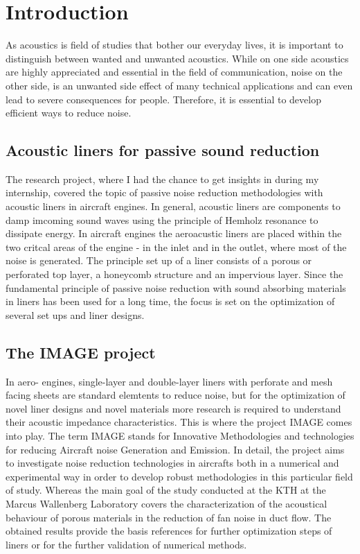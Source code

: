 \documentclass[11pt]{report} %
\begin{document}
\chapter{Introduction} 
As acoustics is field of studies that bother our everyday lives, it is important to distinguish between wanted and unwanted acoustics.
While on one side acoustics are highly appreciated and essential in the field of communication, noise on the other side, is an unwanted side effect of many technical applications and can even lead to severe consequences for people.
Therefore, it is essential to develop efficient ways to reduce noise.

\section{Acoustic liners for passive sound reduction}
The research project, where I had the chance to get insights in during my internship, covered the topic of passive noise reduction methodologies with acoustic liners in aircraft engines.
In general, acoustic liners are components to damp imcoming sound waves using the principle of Hemholz resonance to dissipate energy.
In aircraft engines the aeroacustic liners are placed within the two critcal areas of the engine - in the inlet and in the outlet, where most of the noise is generated. 	 
The principle set up of a liner consists of a porous or perforated top layer, a honeycomb structure and an impervious layer. 
Since the fundamental principle of passive noise reduction with sound absorbing materials in liners has been used for a long time, the focus is set on the optimization of several set ups and liner designs.


\section{The IMAGE project} 
In aero- engines, single-layer and double-layer liners with perforate and mesh facing sheets are standard elemtents to reduce noise, but for the optimization of novel liner designs and novel materials more research is required to understand their acoustic impedance characteristics.
This is where the project IMAGE comes into play.
The term IMAGE stands for Innovative Methodologies and technologies for reducing Aircraft noise Generation and Emission.
In detail, the project aims to investigate noise reduction technologies in aircrafts both in a numerical and experimental way in order to develop robust methodologies in this particular field of study.  
Whereas the main goal of the study conducted at the KTH at the Marcus Wallenberg Laboratory covers the characterization of the acoustical behaviour of porous materials in the reduction of fan noise in duct flow. 
The obtained results provide the  basis references for further optimization steps of liners or for the further validation of numerical methods. 
\end{document}
